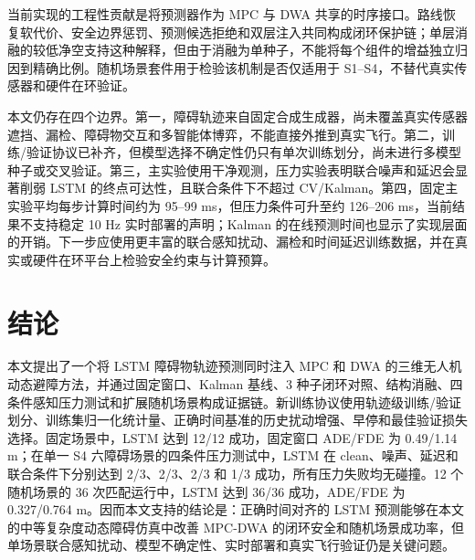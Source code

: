 \documentclass[10pt,a4paper,twocolumn]{ctexart}
\begin{document}
当前实现的工程性贡献是将预测器作为 MPC 与 DWA 共享的时序接口。路线恢复软代价、安全边界惩罚、预测候选拒绝和双层注入共同构成闭环保护链；单层消融的较低净空支持这种解释，但由于消融为单种子，不能将每个组件的增益独立归因到精确比例。随机场景套件用于检验该机制是否仅适用于 S1–S4，不替代真实传感器和硬件在环验证。

本文仍存在四个边界。第一，障碍轨迹来自固定合成生成器，尚未覆盖真实传感器遮挡、漏检、障碍物交互和多智能体博弈，不能直接外推到真实飞行。第二，训练/验证协议已补齐，但模型选择不确定性仍只有单次训练划分，尚未进行多模型种子或交叉验证。第三，主实验使用干净观测，压力实验表明联合噪声和延迟会显著削弱 LSTM 的终点可达性，且联合条件下不超过 CV/Kalman。第四，固定主实验平均每步计算时间约为 95–99 ms，但压力条件可升至约 126–206 ms，当前结果不支持稳定 10 Hz 实时部署的声明；Kalman 的在线预测时间也显示了实现层面的开销。下一步应使用更丰富的联合感知扰动、漏检和时间延迟训练数据，并在真实或硬件在环平台上检验安全约束与计算预算。

\section{结论}

本文提出了一个将 LSTM 障碍物轨迹预测同时注入 MPC 和 DWA 的三维无人机动态避障方法，并通过固定窗口、Kalman 基线、3 种子闭环对照、结构消融、四条件感知压力测试和扩展随机场景构成证据链。新训练协议使用轨迹级训练/验证划分、训练集归一化统计量、正确时间基准的历史扰动增强、早停和最佳验证损失选择。固定场景中，LSTM 达到 12/12 成功，固定窗口 ADE/FDE 为 0.49/1.14 m；在单一 S4 六障碍场景的四条件压力测试中，LSTM 在 clean、噪声、延迟和联合条件下分别达到 2/3、2/3、2/3 和 1/3 成功，所有压力失败均无碰撞。12 个随机场景的 36 次匹配运行中，LSTM 达到 36/36 成功，ADE/FDE 为 0.327/0.764 m。因而本文支持的结论是：正确时间对齐的 LSTM 预测能够在本文的中等复杂度动态障碍仿真中改善 MPC-DWA 的闭环安全和随机场景成功率，但单场景联合感知扰动、模型不确定性、实时部署和真实飞行验证仍是关键问题。
\end{document}
